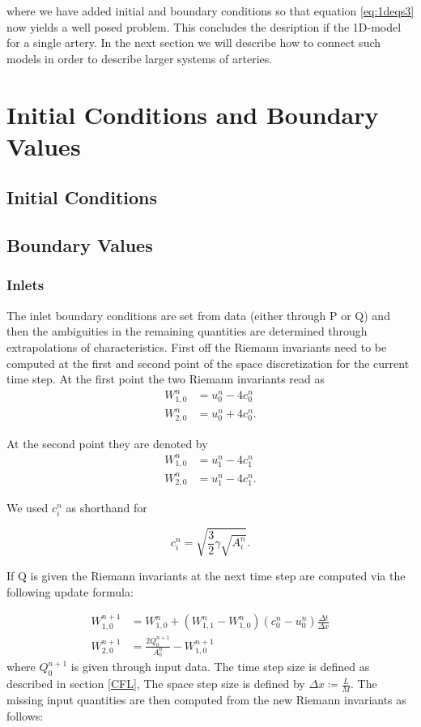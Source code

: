 \documentclass[a4paper, oneside]{discothesis}
\begin{document}
where we have added initial and boundary conditions so that equation \ref{eq:1deqs3} now yields a well posed problem.
This concludes the desription if the 1D-model for a single artery.
In the next section we will describe how to connect such models in order to describe larger systems of arteries.


\section{Initial Conditions and Boundary Values}
\subsection{Initial Conditions}
\subsection{Boundary Values}
\subsubsection{Inlets}
The inlet boundary conditions are set from data (either through P or Q) and then the ambiguities in the remaining quantities are determined through extrapolations of characteristics.
First off the Riemann invariants need to be computed at the first and second point of the space discretization for the current time step.
At the first point the two Riemann invariants read as
\begin{align}
	W_{1,0}^n &= u^n_0 - 4c^n_0\\
	W_{2,0}^n &= u^n_0 + 4c^n_0.
\end{align}

At the second point they are denoted by
\begin{align}
	W_{1,0}^n &= u^n_1 - 4c^n_1\\
	W_{2,0}^n &= u^n_1 - 4c^n_1.
\end{align}

We used $c_i^n$ as shorthand for

\begin{equation}
	c^n_i = \sqrt{\frac{3}{2}\gamma\sqrt{A^n_i}}.
\end{equation}

If Q is given the Riemann invariants at the next time step are computed via the following update formula:

\begin{align}
	W_{1,0}^{n+1} &= W^n_{1,0} + (W^n_{1,1} - W^n_{1,0})(c^n_0-u^n_0) \frac{\Delta t}{\Delta x} \label{update1a}\\
	W_{2,0}^{n+1} &= \frac{2Q^{n+1}_0}{A^n_0} - W^{n+1}_{1,0} \label{update2a}
\end{align}
where $Q^{n+1}_0$ is given through input data.
The time step size is defined as described in section \ref{CFL},
The space step size is defined by $\Delta x \coloneqq \frac{L}{M}$.
The missing input quantities are then computed from the new Riemann invariants as follows:
\end{document}
